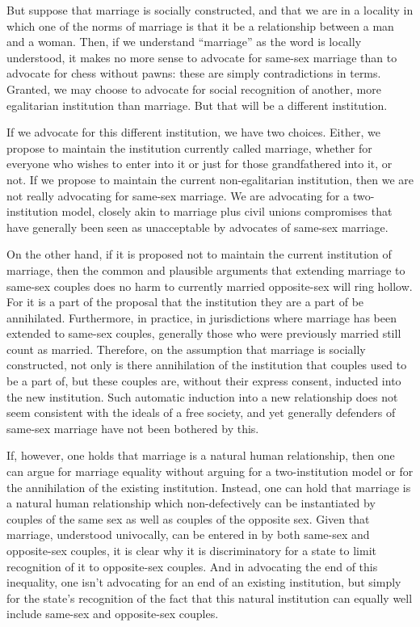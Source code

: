 But suppose that marriage is socially constructed, and that we are in a locality in which one of the norms of marriage is that it be a relationship
between a man and a woman. Then, if we understand ``marriage'' as the word is locally understood, it makes no more sense to advocate for same-sex marriage
than to advocate for chess without pawns: these are simply contradictions in terms. Granted, we may choose to advocate for social recognition of another,
more egalitarian institution than marriage. But that will be a different institution.

If we advocate for this different institution, we have two choices. Either, we propose to maintain the institution currently called marriage, whether for everyone
who wishes to enter into it or just for those grandfathered into it, or not. If we propose to maintain the current non-egalitarian institution, then we are not
really advocating for same-sex marriage. We are advocating for a two-institution model, closely akin to marriage plus civil unions compromises that have generally been
seen as unacceptable by advocates of same-sex marriage.

On the other hand, if it is proposed not to maintain the current institution of marriage, then the common and plausible
arguments that extending marriage to same-sex couples does no harm to currently married opposite-sex will ring hollow. For it is a part of the proposal that the
institution they are a part of be annihilated. Furthermore, in practice, in jurisdictions where marriage has been extended to same-sex couples, generally those who were
previously married still count as married. Therefore, on the assumption that marriage is socially constructed, not only is there annihilation of the institution
that couples used to be a part of, but these couples are, without their express consent, inducted into the new institution. Such automatic induction into a new
relationship does not seem consistent with the ideals of a free society, and yet generally defenders of same-sex marriage have not been bothered by this.

If, however, one holds that marriage is a natural human relationship, then one can argue for marriage equality without arguing for a two-institution model or for
the annihilation of the existing institution. Instead, one can hold that marriage is a natural human relationship which non-defectively can be instantiated by
couples of the same sex as well as couples of the opposite sex. Given that marriage, understood univocally, can be entered in by both same-sex and opposite-sex couples, it is clear why
it is discriminatory for a state to limit recognition of it to opposite-sex couples. And in advocating the end of this inequality, one isn't advocating for an end of
an existing institution, but simply for the state's recognition of the fact that this natural institution can equally well include same-sex and opposite-sex couples.

